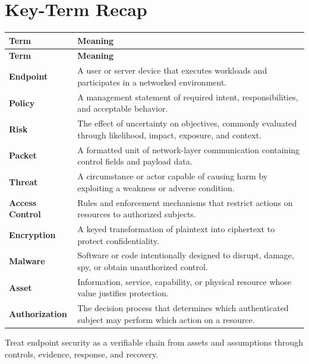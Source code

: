 \documentclass[11pt]{article}
\begin{document}
\section*{Key-Term Recap}
\begin{longtable}{>{\RaggedRight\arraybackslash}p{}>{\RaggedRight\arraybackslash}p{}}
\toprule\rowcolor{Navy}\color{white}\textbf{Term} & \color{white}\textbf{Meaning}\\\midrule
\endfirsthead
\toprule\rowcolor{Navy}\color{white}\textbf{Term} & \color{white}\textbf{Meaning}\\\midrule
\endhead
\textbf{Endpoint} & A user or server device that executes workloads and participates in a networked environment. \\\midrule
\textbf{Policy} & A management statement of required intent, responsibilities, and acceptable behavior. \\\midrule
\textbf{Risk} & The effect of uncertainty on objectives, commonly evaluated through likelihood, impact, exposure, and context. \\\midrule
\textbf{Packet} & A formatted unit of network-layer communication containing control fields and payload data. \\\midrule
\textbf{Threat} & A circumstance or actor capable of causing harm by exploiting a weakness or adverse condition. \\\midrule
\textbf{Access Control} & Rules and enforcement mechanisms that restrict actions on resources to authorized subjects. \\\midrule
\textbf{Encryption} & A keyed transformation of plaintext into ciphertext to protect confidentiality. \\\midrule
\textbf{Malware} & Software or code intentionally designed to disrupt, damage, spy, or obtain unauthorized control. \\\midrule
\textbf{Asset} & Information, service, capability, or physical resource whose value justifies protection. \\\midrule
\textbf{Authorization} & The decision process that determines which authenticated subject may perform which action on a resource. \\\midrule
\bottomrule
\end{longtable}
\begin{takeawaybox}
Treat endpoint security as a verifiable chain from assets and assumptions through controls, evidence, response, and recovery.
\end{takeawaybox}
\end{document}
